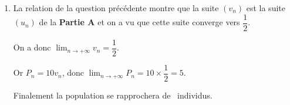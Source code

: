 \begin{enumerate}
\begin{enumerate}
$v_{n+1} = 0,2\left(10v_n - 10v_n^2\right) = 2v_n \left(1 - v_n\right)$.
		\item %
La relation de la question précédente montre que la suite $\left(v_n \right)$ est la suite $\left(u_n \right)$ de la \textbf{Partie A} et on a vu que cette suite converge vers $\dfrac12$.

On a donc $\displaystyle\lim_{n \to + \infty} v_n = \dfrac12$.

Or $P_n = 10v_n$, donc $\displaystyle\lim_{n \to + \infty}P_n = 10 \times \dfrac12 = 5$.

Finalement la population se rapprochera de ~individus.
	\end{enumerate}
\end{enumerate}
